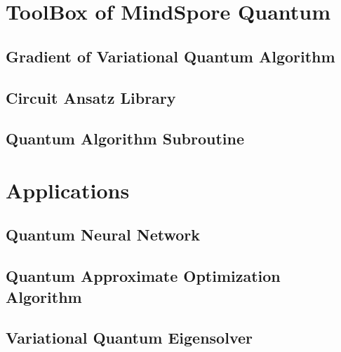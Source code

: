 \documentclass[pra,twocolumn,superscriptaddress,floatfix,nofootinbib,amsmath,amssymb]{revtex4-1}
\numberwithin{equation}{section}
\numberwithin{figure}{section}
\numberwithin{table}{section}
\begin{document}
\section{ToolBox of MindSpore Quantum}
\label{sec:toolbox}
\subsection{Gradient of Variational Quantum Algorithm}


\subsection{Circuit Ansatz Library}


\subsection{Quantum Algorithm Subroutine}



\section{Applications}
\label{sec:applications}
\subsection{Quantum Neural Network}








\subsection{Quantum Approximate Optimization Algorithm}


\subsection{Variational Quantum Eigensolver}

\end{document}
